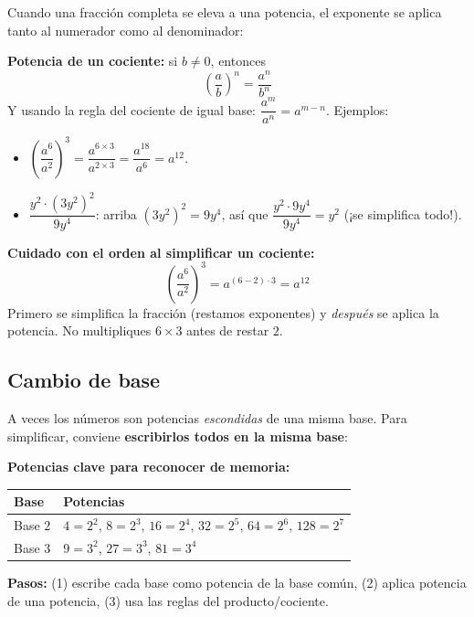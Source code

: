 \documentclass[12pt, letterpaper]{article}
\begin{document}
Cuando una fracción completa se eleva a una potencia, el exponente se aplica tanto al numerador como al denominador:

\begin{cuadroteoria}
  \textbf{Potencia de un cociente:} si $b \neq 0$, entonces
  \[
    \left(\frac{a}{b}\right)^n = \frac{a^n}{b^n}
  \]
  Y usando la regla del cociente de igual base: $\dfrac{a^m}{a^n} = a^{m-n}$. Ejemplos:
  \begin{itemize}
    \item $\left(\dfrac{a^{6}}{a^2}\right)^3 = \dfrac{a^{6 \times 3}}{a^{2 \times 3}} = \dfrac{a^{18}}{a^6} = a^{12}$.
    \item $\dfrac{y^2 \cdot (3y^2)^2}{9y^4}$: arriba $(3y^2)^2 = 9y^4$, así que $\dfrac{y^2 \cdot 9y^4}{9y^4} = y^2$ (¡se simplifica todo!).
  \end{itemize}
\end{cuadroteoria}

\begin{cuadroadvertencia}
  \textbf{Cuidado con el orden al simplificar un cociente:}
  \[
    \left(\frac{a^{6}}{a^2}\right)^3 = a^{(6-2) \cdot 3} = a^{12}
  \]
  Primero se simplifica la fracción (restamos exponentes) y \emph{después} se aplica la potencia. No multipliques $6 \times 3$ antes de restar $2$.
\end{cuadroadvertencia}

\subsection{Cambio de base}

A veces los números son potencias \emph{escondidas} de una misma base. Para simplificar, conviene \textbf{escribirlos todos en la misma base}:

\begin{cuadroteoria}
  \textbf{Potencias clave para reconocer de memoria:}
  \begin{center}
    \begin{tabular}{ll}
      \toprule
      \textbf{Base} & \textbf{Potencias} \\
      \midrule
      Base $2$ & $4 = 2^2$, \quad $8 = 2^3$, \quad $16 = 2^4$, \quad $32 = 2^5$, \quad $64 = 2^6$, \quad $128 = 2^7$ \\
      Base $3$ & $9 = 3^2$, \quad $27 = 3^3$, \quad $81 = 3^4$ \\
      \bottomrule
    \end{tabular}
  \end{center}
  \textbf{Pasos:} (1) escribe cada base como potencia de la base común, (2) aplica potencia de una potencia, (3) usa las reglas del producto/cociente.
\end{cuadroteoria}
\end{document}

